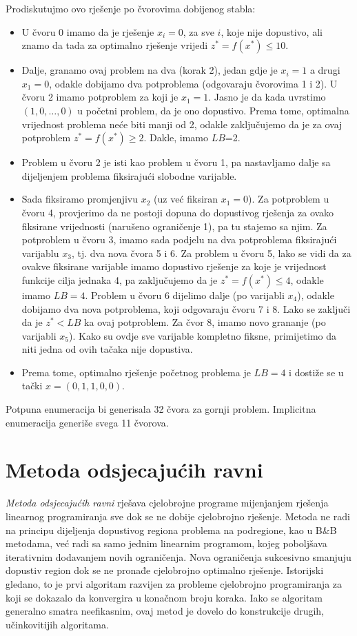 \documentclass[a4paper, utf8, 11pt, colorlinks]{book}
\begin{document}
Prodiskutujmo ovo rješenje po čvorovima dobijenog stabla:
  \begin{itemize}
      \item U čvoru 0 imamo da je rješenje $x_i = 0$, za sve $i$, koje  nije dopustivo, ali znamo da   tada za optimalno rješenje vrijedi $z^*=f(x^*) \leq 10$.
      \item  Dalje, granamo ovaj problem na dva (korak 2), jedan gdje je $x_i=1$ a drugi $x_1=0$, odakle dobijamo dva potproblema (odgovaraju čvorovima 1 i 2). U čvoru 2 imamo potproblem za koji je $x_1=1$. Jasno je da kada uvrstimo $(1,0, \ldots, 0)$ u početni problem, da je ono dopustivo. Prema tome, optimalna vrijednost problema neće biti manji od 2, odakle zaključujemo da je za ovaj potproblem $z^*=f(x^*) \geq 2$. Dakle, imamo $LB$=2. 
      \item Problem u čvoru 2 je isti kao problem u čvoru 1, pa nastavljamo dalje sa dijeljenjem problema fiksirajući slobodne varijable. 
      \item Sada fiksiramo promjenjivu $x_2$ (uz već fiksiran $x_1=0$). 
            Za potproblem u čvoru 4, provjerimo da ne postoji dopuna do dopustivog rješenja za ovako fiksirane vrijednosti (narušeno ograničenje 1), pa tu stajemo sa njim. Za potproblem u čvoru 3, imamo sada podjelu na dva potproblema fiksirajući varijablu $x_3$, tj. dva   nova čvora 5 i 6. Za problem u čvoru 5, lako se vidi da za ovakve fiksirane varijable imamo dopustivo rješenje za koje je vrijednost funkcije cilja jednaka 4, pa zaključujemo da je $z^*=f(x^*) \leq 4$, odakle imamo $LB=4$. Problem u čvoru 6 dijelimo dalje (po varijabli $x_4$), odakle dobijamo dva nova potproblema, koji odgovaraju čvoru 7 i 8. Lako se zaključi da je $z^*<LB$ ka ovaj potproblem.  Za čvor 8, imamo novo grananje (po varijabli $x_5$). Kako su ovdje sve varijable kompletno fiksne, primijetimo da niti jedna od ovih tačaka  nije dopustiva.
            \item Prema tome, optimalno rješenje početnog problema je $LB=4$ i dostiže se u tački $x=(0, 1, 1, 0, 0)$. 
  \end{itemize}
  Potpuna enumeracija bi generisala 32 čvora za gornji problem. Implicitna enumeracija generiše svega 11 čvorova. 
 
\section{Metoda odsjecajućih ravni}
  
\emph{Metoda odsjecajućih ravni} rješava cjelobrojne programe mijenjanjem rješenja linearnog programiranja sve dok se ne dobije cjelobrojno rješenje. Metoda ne radi  na principu dijeljenja dopustivog regiona problema na podregione, kao u B\&B metodama, već radi sa samo jednim linearnim programom, kojeg poboljšava iterativnim dodavanjem novih ograničenja. Nova ograničenja sukcesivno smanjuju dopustiv region dok se ne pronađe cjelobrojno optimalno rješenje.   
 Istorijski gledano, to je prvi algoritam razvijen za probleme cjelobrojno programiranja za koji se dokazalo da konvergira u konačnom broju
koraka. Iako se algoritam generalno smatra   neefikasnim, ovaj metod je dovelo do konstrukcije drugih, učinkovitijih algoritama.  
  
\end{document}
